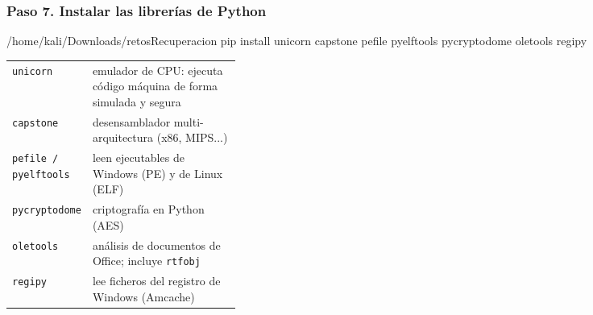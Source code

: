 \documentclass[11pt,a4paper]{article}
\begin{document}
\subsubsection*{Paso 7. Instalar las librerías de Python}
\begin{comando}{/home/kali/Downloads/retosRecuperacion}
pip install unicorn capstone pefile pyelftools pycryptodome oletools regipy
\end{comando}
\begin{tcolorbox}[enhanced, breakable, colback=gray!3, colframe=gray!35, boxrule=0.3pt, arc=1pt, left=4pt, right=4pt, top=2pt, bottom=2pt, fonttitle=\sffamily\scriptsize\bfseries, coltitle=black!70, colbacktitle=gray!10, title={Qué hace cada parte}, attach title to upper, before skip=2pt, after skip=4pt, fontupper=\small]
\par{\renewcommand{\arraystretch}{1.12}\begin{tabularx}{\linewidth}{@{}>{\raggedright\arraybackslash}p{0.33\linewidth}>{\raggedright\arraybackslash}X@{}}
\texttt{unicorn} & emulador de CPU: ejecuta código máquina de forma simulada y segura \\
\texttt{capstone} & desensamblador multi-arquitectura (x86, MIPS...) \\
\texttt{pefile /\allowbreak{} pyelftools} & leen ejecutables de Windows (PE) y de Linux (ELF) \\
\texttt{pycryptodome} & criptografía en Python (AES) \\
\texttt{oletools} & análisis de documentos de Office; incluye \texttt{rtfobj} \\
\texttt{regipy} & lee ficheros del registro de Windows (Amcache) \\
\end{tabularx}}
\end{tcolorbox}
\end{document}
